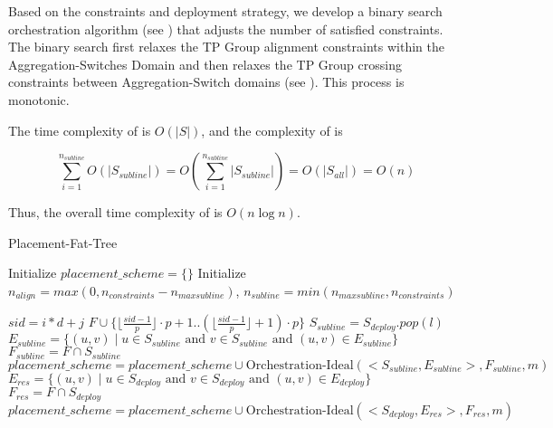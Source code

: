  Based on the constraints and deployment strategy, we develop a binary search orchestration algorithm (see ) that adjusts the number of satisfied constraints. The binary search first relaxes the TP Group alignment constraints within the Aggregation-Switches Domain and then relaxes the TP Group crossing constraints between Aggregation-Switch domains (see ). This process is monotonic.




The time complexity of  is $O(|S|)$, and the complexity of  is 

$$\sum_{i=1}^{n_{subline}} O(|S_{subline}|) = O(\sum_{i=1}^{n_{subline}} |S_{subline}|) = O(|S_{all}|) = O(n)$$  

Thus, the overall time complexity of  is $O(n \log n)$.

\begin{algorithm}[!h]
\small
\caption{Placement-Fat-Tree}
\label{alg:placement-fat-tree}
 Initialize $placement\_scheme=\{\}$\;
 Initialize $n_{align}=max(0,n_{constraints}-n_{maxsubline})$, $n_{subline}=min(n_{maxsubline},n_{constraints})$\;
 
{
    {
        $sid=i*d+j$\;
        {
            $F\cup \{\lfloor \frac{sid-1}{p}\rfloor\cdot p+1..(\lfloor \frac{sid-1}{p}\rfloor+1)\cdot p \}$\;
        }
    }
}
{
     $S_{subline}=S_{deploy}.pop(l)$\;
     $E_{subline}=\{(u,v)\mid u\in S_{subline} \text{ and } v\in S_{subline} \text{ and } (u,v)\in E_{subline}\}$\;
     $F_{subline}=F\cap S_{subline}$\;
     $placement\_scheme=placement\_scheme\cup \text{Orchestration-Ideal}(<S_{subline},E_{subline}>, F_{subline}, m)$\;
}
 $E_{res}=\{(u,v)\mid u \in S_{deploy} \text{ and } v \in S_{deploy} \text{ and } (u,v) \in E_{deploy}\}$\;
 $F_{res}=F\cap S_{deploy}$\;
 $placement\_scheme=placement\_scheme\cup \text{Orchestration-Ideal}(<S_{deploy},E_{res}>, F_{res},m)$\;
\end{algorithm}

